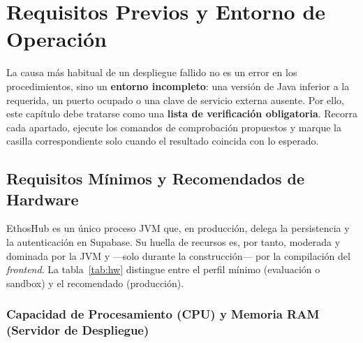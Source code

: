 \chapter[Requisitos y Entorno de Operación]{Requisitos Previos y Entorno de Operación}%
\label{ch:requisitos}

La causa más habitual de un despliegue fallido no es un error en los procedimientos, sino
un \textbf{entorno incompleto}: una versión de Java inferior a la requerida, un puerto
ocupado o una clave de servicio externa ausente. Por ello, este capítulo debe tratarse
como una \textbf{lista de verificación obligatoria}. Recorra cada apartado, ejecute los
comandos de comprobación propuestos y marque la casilla correspondiente solo cuando el
resultado coincida con lo esperado.\par

\section{Requisitos Mínimos y Recomendados de Hardware}%
\label{sec:hardware}

EthosHub es un único proceso JVM que, en producción, delega la persistencia y la
autenticación en Supabase. Su huella de recursos es, por tanto, moderada y dominada por
la JVM y —solo durante la construcción— por la compilación del \textit{frontend}. La
tabla~\ref{tab:hw} distingue entre el perfil mínimo (evaluación o sandbox) y el
recomendado (producción).\par

\subsection[Procesamiento (CPU) y Memoria RAM]{Capacidad de Procesamiento (CPU) y Memoria RAM (Servidor de Despliegue)}%
\label{subsec:cpu-ram}

